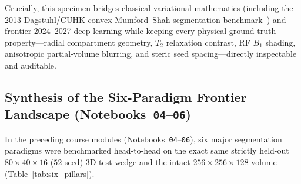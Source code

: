 \documentclass[10pt,a4paper]{article}
\renewcommand{\_}{\origunderscore\allowbreak}
\begin{document}
Crucially, this specimen bridges classical variational mathematics (including the 2013 Dagstuhl/CUHK convex Mumford--Shah segmentation benchmark~\cite{cai2013mumfordshah}) and frontier 2024--2027 deep learning while keeping every physical ground-truth property---radial compartment geometry, $T_2$ relaxation contrast, RF $B_1$ shading, anisotropic partial-volume blurring, and steric seed spacing---directly inspectable and auditable.

\subsection{Synthesis of the Six-Paradigm Frontier Landscape (Notebooks~\texttt{04}--\texttt{06})}

In the preceding course modules (Notebooks~\texttt{04}--\texttt{06}), six major segmentation paradigms were benchmarked head-to-head on the exact same strictly held-out $80 \times 40 \times 16$ ($52$-seed) 3D test wedge and the intact $256 \times 256 \times 128$ volume (Table~\ref{tab:six_pillars}).
\end{document}
